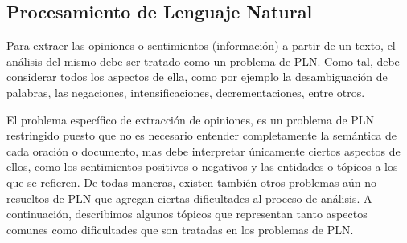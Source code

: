 {\subsection{Procesamiento de Lenguaje Natural}

Para extraer las opiniones o sentimientos (informaci\'on) a partir de un texto, el an\'alisis del mismo debe ser tratado como un problema de PLN. Como tal, debe considerar todos los aspectos de ella, como por ejemplo la desambiguaci\'on de palabras, las negaciones, intensificaciones, decrementaciones, entre otros.
\newline

El problema espec\'ifico de extracci\'on de opiniones, es un problema de PLN restringido puesto que no es necesario entender completamente la sem\'antica de cada oraci\'on o documento, mas debe interpretar \'unicamente ciertos aspectos de ellos, como los sentimientos positivos o negativos y las entidades o t\'opicos a los que se refieren. De todas maneras, existen tambi\'en otros problemas a\'un no resueltos de PLN que agregan ciertas dificultades al proceso de an\'alisis. A continuaci\'on, describimos algunos t\'opicos que representan tanto aspectos comunes como dificultades que son tratadas en los problemas de PLN.

\begin{itemize}


\end{itemize}}
